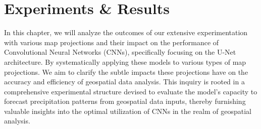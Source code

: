 
\clearpage
\cleardoublepage

\chapter{Experiments \& Results}

\label{chap:experiments_results}

In this chapter, we will analyze the outcomes of our extensive experimentation with various map projections and their impact on the performance
of Convolutional Neural Networks (CNNs), specifically focusing on the U-Net architecture. By systematically applying these models to various types of
map projections. We aim to clarify the subtle impacts these projections have on the accuracy and efficiency of
geospatial data analysis. This inquiry is rooted in a comprehensive experimental structure devised to evaluate the model's capacity to forecast precipitation patterns
from geospatial data inputs, thereby furnishing valuable insights into the optimal utilization of CNNs in the realm of geospatial analysis.





